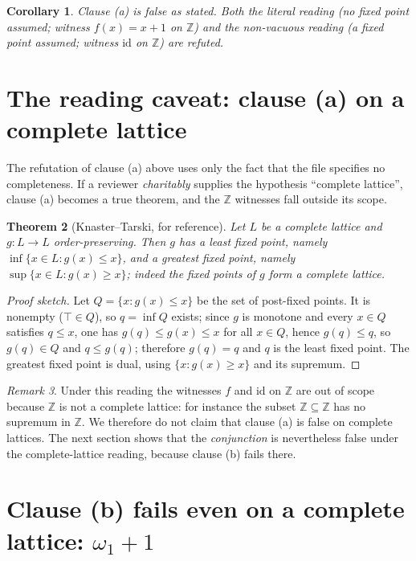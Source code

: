 \documentclass[11pt]{article}
\newtheorem{theorem}{Theorem}
\newtheorem{corollary}[theorem]{Corollary}
\theoremstyle{definition}
\theoremstyle{remark}
\newtheorem{remark}[theorem]{Remark}
\newcommand{\Z}{\mathbb{Z}}
\newcommand{\id}{\mathrm{id}}
\newcommand{\Lc}{L}
\begin{document}
\begin{corollary}\label{cor:clauseA}
Clause (a) is false as stated. Both the literal reading (no fixed point assumed;
witness $f(x)=x+1$ on $\Z$) and the non-vacuous reading (a fixed point assumed;
witness $\id$ on $\Z$) are refuted.
\end{corollary}

\section{The reading caveat: clause (a) on a complete lattice}
\label{sec:reading}

The refutation of clause (a) above uses only the fact that the file specifies
no completeness. If a reviewer \emph{charitably} supplies the hypothesis
``complete lattice'', clause (a) becomes a true theorem, and the $\Z$ witnesses
fall outside its scope.

\begin{theorem}[Knaster--Tarski, for reference]
Let $\Lc$ be a complete lattice and $g:\Lc\to\Lc$ order-preserving. Then $g$ has
a least fixed point, namely $\inf\{x\in\Lc : g(x)\le x\}$, and a greatest fixed
point, namely $\sup\{x\in\Lc : g(x)\ge x\}$; indeed the fixed points of $g$ form
a complete lattice.
\end{theorem}

\begin{proof}[Proof sketch]
Let $Q=\{x : g(x)\le x\}$ be the set of post-fixed points. It is nonempty
($\top\in Q$), so $q=\inf Q$ exists; since $g$ is monotone and every $x\in Q$
satisfies $q\le x$, one has $g(q)\le g(x)\le x$ for all $x\in Q$, hence
$g(q)\le q$, so $g(q)\in Q$ and $q\le g(q)$; therefore $g(q)=q$ and $q$ is the
least fixed point. The greatest fixed point is dual, using
$\{x : g(x)\ge x\}$ and its supremum.
\end{proof}

\begin{remark}
Under this reading the witnesses $f$ and $\id$ on $\Z$ are out of scope
because $\Z$ is not a complete lattice: for instance the subset $\Z\subseteq\Z$
has no supremum in $\Z$. We therefore do not claim that clause (a) is false on
complete lattices. The next section shows that the \emph{conjunction} is
nevertheless false under the complete-lattice reading, because clause (b)
fails there.
\end{remark}

\section{Clause (b) fails even on a complete lattice: $\omega_1+1$}
\end{document}
